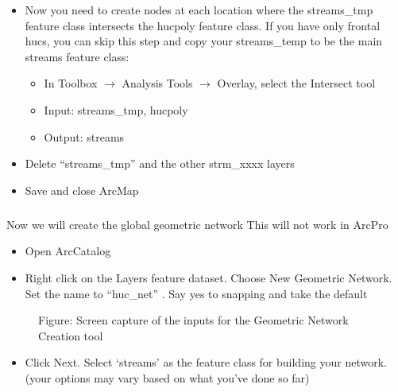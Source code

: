 \documentclass[letterpaper,10pt,english]{sphinxmanual}
\begin{document}
\begin{itemize}
\item {} 
Now you need to create nodes at each location where the streams\_tmp feature class intersects the hucpoly feature class. If you have only frontal hucs, you can skip this step and copy your streams\_temp to be the main streams feature class:
\begin{itemize}
\item {} 
In Toolbox \(\rightarrow\) Analysis Tools \(\rightarrow\) Overlay, select the Intersect tool

\item {} 
Input: streams\_tmp, hucpoly

\item {} 
Output: streams

\end{itemize}

\item {} 
Delete “streams\_tmp” and the other strm\_xxxx layers

\item {} 
Save and close ArcMap

\end{itemize}


\paragraph{}
\label{\detokenize{ex_2:global-geometric-network}}

\subparagraph{}
\label{\detokenize{ex_2:initial-geometric-network-creation}}
Now we will create the global geometric network  This will not work in ArcPro
\begin{itemize}
\item {} 
Open ArcCatalog

\item {} 
Right click on the Layers feature dataset.  Choose New Geometric Network. Set the name to “huc\_net” . Say yes to snapping and take the default

\end{itemize}

\begin{figure}[htbp]
\centering
\capstart

\noindent{}
\caption{Figure: Screen capture of the inputs for the Geometric Network Creation tool}\label{\detokenize{ex_2:id25}}\end{figure}
\begin{itemize}
\item {} 
Click Next. Select ‘streams’ as the feature class for building your network.  (your options may vary based on what you’ve done so far)

\end{itemize}
\end{document}
